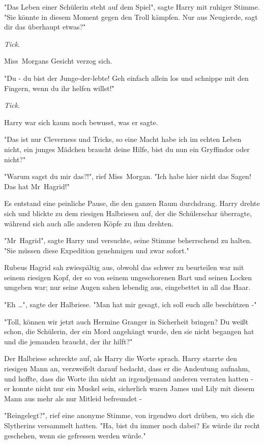 {"Das Leben einer Schülerin steht auf dem Spiel", sagte Harry mit ruhiger Stimme. "Sie könnte in diesem Moment gegen den Troll kämpfen. Nur aus Neugierde, sagt dir das überhaupt etwas?"

\emph{Tick}.

Miss~Morgans Gesicht verzog sich.

"Du - du bist der Junge-der-lebte! Geh einfach allein los und schnippe mit den Fingern, wenn du ihr helfen willst!"

\emph{Tick}.

Harry war sich kaum noch bewusst, was er sagte.

"Das ist nur Cleverness und Tricks, so eine Macht habe ich im echten Leben nicht, ein junges Mädchen braucht deine Hilfe, bist du nun ein Gryffindor oder nicht?"

"Warum sagst du mir das?!", rief Miss~Morgan. "Ich habe hier nicht das Sagen! Das hat Mr~Hagrid!"

Es entstand eine peinliche Pause, die den ganzen Raum durchdrang. Harry drehte sich und blickte zu dem riesigen Halbriesen auf, der die Schülerschar überragte, während sich auch alle anderen Köpfe zu ihm drehten.

"Mr~Hagrid", sagte Harry und versuchte, seine Stimme beherrschend zu halten. "Sie müssen diese Expedition genehmigen und zwar sofort."

Rubeus Hagrid sah zwiespältig aus, obwohl das schwer zu beurteilen war mit seinem riesigen Kopf, der so von seinem ungeschorenen Bart und seinen Locken umgeben war; nur seine Augen sahen lebendig aus, eingebettet in all das Haar.

"Eh …", sagte der Halbriese. "Man hat mir gesagt, ich soll euch alle beschützen -"

"Toll, können wir jetzt auch Hermine Granger in Sicherheit bringen? Du weißt schon, die Schülerin, der ein Mord angehängt wurde, den sie nicht begangen hat und die jemanden braucht, der ihr hilft?"

Der Halbriese schreckte auf, als Harry die Worte sprach. Harry starrte den riesigen Mann an, verzweifelt darauf bedacht, dass er die Andeutung aufnahm, und hoffte, dass die Worte ihn nicht an irgendjemand anderen verraten hatten - er konnte nicht nur ein Muskel sein, sicherlich waren James und Lily mit diesem Mann aus mehr als nur Mitleid befreundet -

"Reingelegt?", rief eine anonyme Stimme, von irgendwo dort drüben, wo sich die Slytherins versammelt hatten. "Ha, bist du immer noch dabei? Es würde ihr recht geschehen, wenn sie gefressen werden würde."

}

